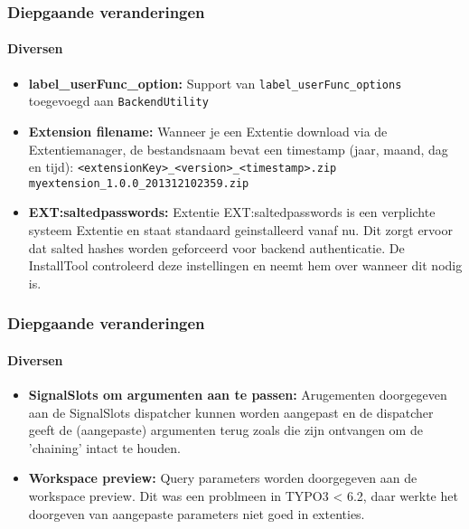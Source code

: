 \begin{frame}[fragile]
	\frametitle{Diepgaande veranderingen}
	\framesubtitle{Diversen}

	\begin{itemize}

		\item \textbf{label\_userFunc\_option:}\newline
			\small
				Support van \texttt{label\_userFunc\_options} toegevoegd aan \texttt{BackendUtility}
			\normalsize

		\item \textbf{Extension filename:}\newline
			\small
				Wanneer je een Extentie download via de Extentiemanager, de bestandsnaam bevat een timestamp (jaar, maand, dag en tijd):\newline
				\texttt{<extensionKey>\_<version>\_<timestamp>.zip}\newline
				\texttt{myextension\_1.0.0\_201312102359.zip}
			\normalsize

		\item \textbf{EXT:saltedpasswords:}\newline
			\small
				Extentie EXT:saltedpasswords is een verplichte systeem Extentie en staat standaard geinstalleerd vanaf nu.
				Dit zorgt ervoor dat salted hashes worden geforceerd voor backend authenticatie. De InstallTool controleerd deze instellingen en neemt hem over wanneer dit nodig is.
			\normalsize

	\end{itemize}
	
\end{frame}


\begin{frame}[fragile]
	\frametitle{Diepgaande veranderingen}
	\framesubtitle{Diversen}

	\begin{itemize}

		\item \textbf{SignalSlots om argumenten aan te passen:}\newline
			\small
				Arugementen doorgegeven aan de SignalSlots dispatcher kunnen worden aangepast en de dispatcher geeft de (aangepaste) argumenten terug zoals die zijn ontvangen om de 'chaining' intact te houden.
			\normalsize

		\item \textbf{Workspace preview:}\newline
			\small
				Query parameters worden doorgegeven aan de workspace preview. Dit was een problmeen in TYPO3 < 6.2, daar werkte het doorgeven van aangepaste parameters niet goed in extenties.
			\normalsize

	\end{itemize}
	
\end{frame}

